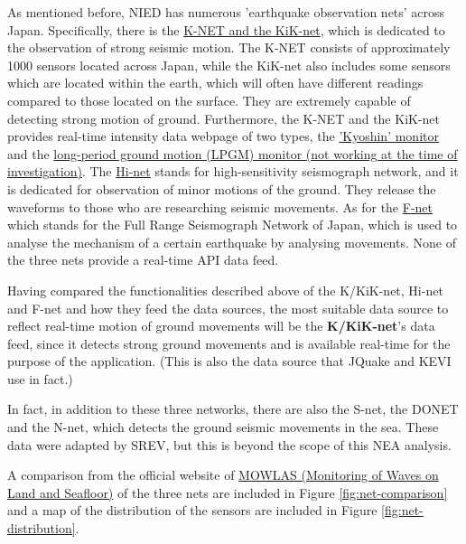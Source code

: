 \documentclass[10pt]{article}
\begin{document}
As mentioned before, NIED has numerous 'earthquake observation nets' across Japan. Specifically, there is the \href{https://www.kyoshin.bosai.go.jp/kyoshin/}{K-NET and the KiK-net}, which is dedicated to the observation of strong seismic motion. The K-NET consists of approximately 1000 sensors located across Japan, while the KiK-net also includes some sensors which are located within the earth, which will often have different readings compared to those located on the surface. They are extremely capable of detecting strong motion of ground. Furthermore, the K-NET and the KiK-net provides real-time intensity data webpage of two types, the \href{http://www.kmoni.bosai.go.jp}{'Kyoshin' monitor} and the \href{https://www.lmoni.bosai.go.jp/monitor/}{long-period ground motion (LPGM) monitor (not working at the time of investigation)}. The \href{https://www.hinet.bosai.go.jp/?LANG=ja}{Hi-net} stands for high-sensitivity seismograph network, and it is dedicated for observation of minor motions of the ground. They release the waveforms to those who are researching seismic movements. As for the \href{https://www.fnet.bosai.go.jp/freesia/top.php?LANG=ja}{F-net} which stands for the Full Range Seismograph Network of Japan, which is used to analyse the mechanism of a certain earthquake by analysing movements. None of the three nets provide a real-time API data feed.

Having compared the functionalities described above of the K/KiK-net, Hi-net and F-net and how they feed the data sources, the most suitable data source to reflect real-time motion of ground movements will be the \textbf{K/KiK-net}'s data feed, since it detects strong ground movements and is available real-time for the purpose of the application. (This is also the data source that JQuake and KEVI use in fact.)

In fact, in addition to these three networks, there are also the S-net, the DONET and the N-net, which detects the ground seismic movements in the sea. These data were adapted by SREV, but this is beyond the scope of this NEA analysis.

A comparison from the official website of \href{https://www.mowlas.bosai.go.jp}{MOWLAS (Monitoring of Waves on Land and Seafloor)} of the three nets are included in Figure \ref{fig:net-comparison} and a map of the distribution of the sensors are included in Figure \ref{fig:net-distribution}.
\end{document}
